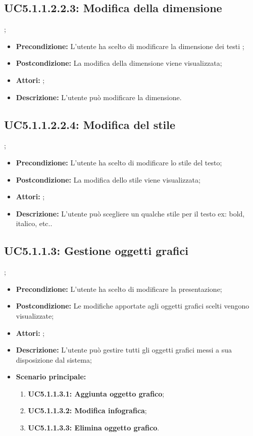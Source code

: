 \subsection{ UC5.1.1.2.2.3: Modifica della dimensione }
;
\begin{itemize}
	\item \textbf{Precondizione:} L'utente ha scelto di modificare la dimensione dei testi ;
	\item \textbf{Postcondizione:} La modifica della dimensione viene visualizzata;
	\item \textbf{Attori:} ;
	\item \textbf{Descrizione:} L'utente può modificare la dimensione.
\end{itemize}
\subsection{ UC5.1.1.2.2.4: Modifica del stile}
;
\begin{itemize}
	\item \textbf{Precondizione:} L'utente ha scelto di modificare lo stile del testo;
	\item \textbf{Postcondizione:} La modifica dello stile viene visualizzata;
	\item \textbf{Attori:} ;
	\item \textbf{Descrizione:} L'utente può scegliere un qualche stile per il testo ex: bold, italico, etc..
\end{itemize}
\subsection{ UC5.1.1.3: Gestione oggetti grafici}
;
\begin{itemize}
	\item \textbf{Precondizione:} L'utente ha scelto di modificare la presentazione;
	\item \textbf{Postcondizione:} Le modifiche apportate agli oggetti grafici scelti vengono visualizzate;
	\item \textbf{Attori:} ;
	\item \textbf{Descrizione:} L'utente può gestire tutti gli oggetti grafici messi a sua disposizione dal sistema;
	\item \textbf{Scenario principale:}
	\begin{enumerate}
		\item \textbf{ UC5.1.1.3.1: Aggiunta oggetto grafico};
		\item \textbf{ UC5.1.1.3.2: Modifica infografica};
		\item \textbf{ UC5.1.1.3.3: Elimina oggetto grafico}.
	\end{enumerate}
\end{itemize}
